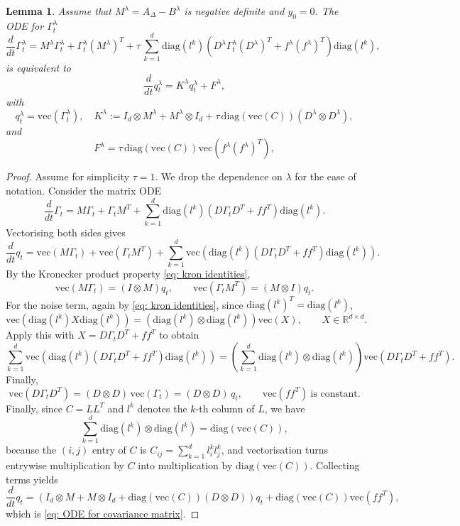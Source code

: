 \documentclass[10pt]{amsart}
\newtheorem{lemma}[theorem]{Lemma}
\numberwithin{equation}{section}
\begin{document}
\begin{lemma}
Assume that $M ^\lambda= A_\Delta -B^\lambda$ is negative definite and $y_0 = 0$. The ODE for $\Gamma_t ^\lambda$
$$
 \frac{d}{dt} \Gamma_t^\lambda  = M^\lambda \Gamma_t ^\lambda + \Gamma_t ^\lambda (M^\lambda)^T + \tau \, \sum_{k=1}^d \mathrm{diag}(l^k) (D^\lambda \Gamma_t^\lambda  (D^\lambda)^T + f^\lambda (f^\lambda)^T) \mathrm{diag} (l^k),
$$
is equivalent to
\begin{equation}
\frac{d}{dt} q^\lambda _t = K^\lambda q_t^\lambda  + F^\lambda,
    \label{eq: ODE for covariance matrix}
\end{equation}
with
$$
q_t^\lambda = \mathrm{vec}(\Gamma_t^\lambda ), \quad K^\lambda := I_d \otimes M^\lambda + M^\lambda \otimes I_d + \tau \,  \mathrm{diag} (\mathrm{vec}(C)) (D^\lambda \otimes D^\lambda),
$$
and
$$
F^\lambda = \tau \,  \mathrm{diag} (\mathrm{vec} (C)) \mathrm{vec}(f^\lambda (f^\lambda)^T),
$$
\label{lemma: vectorisation problem in Rd}
\end{lemma}
\begin{proof}
    Assume for simplicity $\tau  = 1$. We drop the dependence on $\lambda$ for the ease of notation. Consider the matrix ODE
$$
\frac{d}{dt} \Gamma_t  = M \Gamma_t  + \Gamma_t   M^T + \sum_{k=1}^d \mathrm{diag}(l^k) \left(D \Gamma_t  D^T + f f^T\right) \mathrm{diag}(l^k).
$$
Vectorising both sides gives
$$
\frac{d}{dt} q_t = \mathrm{vec}(M\Gamma_t ) + \mathrm{vec}(\Gamma_t  M^T)
          + \sum_{k=1}^d \mathrm{vec} \left(\mathrm{diag}(l^k)  \left(D \Gamma_t  D^T + f f^T\right) \mathrm{diag}(l^k)\right).
$$
By the Kronecker product property \eqref{eq: kron identities},
$$
\mathrm{vec}(M\Gamma_t ) = (I\otimes M)q_t,
\qquad
\mathrm{vec}(\Gamma_t  M^T) = (M\otimes I) q_t.
$$
For the noise term, again by \eqref{eq: kron identities},
since $\mathrm{diag}(l^k)^T=\mathrm{diag}(l^k)$,
$$
\mathrm{vec} \left(\mathrm{diag}(l^k) X   \mathrm{diag}(l^k)\right)
= \left(\mathrm{diag}(l^k)\otimes \mathrm{diag}(l^k)\right) \mathrm{vec}(X),
\qquad X\in\mathbb{R}^{d\times d}.
$$
Apply this with $X = D \Gamma_t  D^T + f f^T$ to obtain
$$
\sum_{k=1}^d  \mathrm{vec} \left(\mathrm{diag}(l^k) (D \Gamma_t  D^T + f f^T) \mathrm{diag}(l^k)\right)
= \left(\sum_{k=1}^d \mathrm{diag}(l^k)\otimes \mathrm{diag}(l^k)\right) 
   \mathrm{vec}(D \Gamma_t  D^T + f f^T).
$$
Finally,
$$
\mathrm{vec}(D \Gamma_t  D^T) = (D\otimes D)\, \mathrm{vec}(\Gamma_t ) = (D\otimes D)\,q_t,
\qquad
\mathrm{vec}(f f^T) \ \text{is constant}.
$$
Finally, since $C=LL^T$ and $l^k$ denotes the $k$-th column of $L$, we have
$$
\sum_{k=1}^d  \mathrm{diag}(l^k)\otimes  \mathrm{diag}(l^k)= \mathrm{diag}( \mathrm{vec}(C)),
$$
because the $(i,j)$ entry of $C$ is $C_{ij}=\sum_{k=1}^d l_i^k l_j^k$, and vectorisation turns
entrywise multiplication by $C$ into multiplication by $ \mathrm{diag}( \mathrm{vec}(C))$.
Collecting terms yields
$$
\frac{d}{dt} q_t = \left(I_d\otimes M + M\otimes I_d +  \mathrm{diag}( \mathrm{vec}(C)) (D\otimes D)\right) q_t +\mathrm{diag}( \mathrm{vec}(C))  \mathrm{vec}(f f^T),
$$
which is \eqref{eq: ODE for covariance matrix}.
\end{proof}
\end{document}
